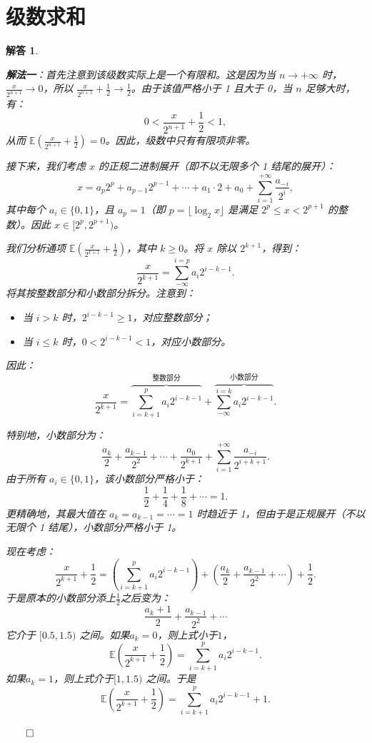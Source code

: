 \documentclass[12pt,UTF8,fontset=none]{ctexbook}
\theoremstyle{exercisestyle}
\theoremstyle{solutionstyle}
\newtheorem*{solution*}{解答}
\newenvironment{solution}
  {\begin{solution*}}
  {\hfill\ensuremath{\qed}\end{solution*}}
\begin{document}
\section{级数求和}\label{calcul-dune-somme}
\begin{solution}
\begin{subquestions}
\item \textbf{解法一}：首先注意到该级数实际上是一个有限和。这是因为当 $n \to +\infty$ 时，$\frac{x}{2^{n+1}} \to 0$，所以 $\frac{x}{2^{n+1}} + \frac{1}{2} \to \frac{1}{2}$。由于该值严格小于 1 且大于 0，当 $n$ 足够大时，有：
$$
0 < \frac{x}{2^{n+1}} + \frac{1}{2} < 1,
$$
从而 $\mathbb{E}\left(\frac{x}{2^{n+1}} + \frac{1}{2}\right) = 0$。因此，级数中只有有限项非零。

接下来，我们考虑 $x$ 的正规二进制展开（即不以无限多个 1 结尾的展开）：
$$
x = a_p 2^p + a_{p-1} 2^{p-1} + \cdots + a_1 \cdot 2 + a_0 + \sum_{i=1}^{+\infty} \frac{a_{-i}}{2^i},
$$
其中每个 $a_i \in \{0,1\}$，且 $a_p = 1$（即 $p = \lfloor \log_2 x \rfloor$ 是满足 $2^p \leq x < 2^{p+1}$ 的整数）。因此 $x \in [2^p, 2^{p+1})$。

我们分析通项 $\mathbb{E}\left(\frac{x}{2^{k+1}} + \frac{1}{2}\right)$，其中 $k \geq 0$。将 $x$ 除以 $2^{k+1}$，得到：
$$
\frac{x}{2^{k+1}} = \sum_{-\infty}^{i=p} a_i 2^{i - k - 1}.
$$
将其按整数部分和小数部分拆分。注意到：
\begin{itemize}
    \item 当 $i > k$ 时，$2^{i - k - 1} \geqslant 1$，对应整数部分；
    \item 当 $i \leqslant k$ 时，$0 < 2^{i - k - 1} < 1$，对应小数部分。
\end{itemize}
因此：
$$
\frac{x}{2^{k+1}} = \overbrace{\sum_{i=k+1}^{p} a_i 2^{i - k - 1}}^{\text{整数部分}} + \overbrace{\sum_{-\infty}^{i=k} a_i 2^{i - k - 1}}^{\text{小数部分}}.
$$

特别地，小数部分为：
$$
\frac{a_k}{2} + \frac{a_{k-1}}{2^2} + \cdots + \frac{a_0}{2^{k+1}} + \sum_{i=1}^{+\infty} \frac{a_{-i}}{2^{i + k + 1}}.
$$
由于所有 $a_i \in \{0,1\}$，该小数部分严格小于：
$$
\frac{1}{2} + \frac{1}{4} + \frac{1}{8} + \cdots = 1.
$$
更精确地，其最大值在 $a_k = a_{k-1} = \cdots = 1$ 时趋近于 1，但由于是正规展开（不以无限个 1 结尾），小数部分严格小于 1。

现在考虑：
$$
\frac{x}{2^{k+1}} + \frac{1}{2} = \left( \sum_{i=k+1}^{p} a_i 2^{i - k - 1} \right) + \left( \frac{a_k}{2} + \frac{a_{k-1}}{2^2} + \cdots \right) + \frac{1}{2}.
$$
于是原本的小数部分添上$\frac{1}{2}$之后变为：
$$
 \frac{a_k + 1}{2} + \frac{a_{k-1}}{2^2} + \cdots 
$$
它介于 $[0.5, 1.5)$ 之间。如果$a_k = 0$，则上式小于$1$，
$$
\mathbb{E}\left(\frac{x}{2^{k+1}} + \frac{1}{2}\right) = \sum_{i=k+1}^{p} a_i 2^{i - k - 1}.
$$
如果$a_k = 1$，则上式介于$[1, 1.5)$ 之间。于是
$$
\mathbb{E}\left(\frac{x}{2^{k+1}} + \frac{1}{2}\right) = \sum_{i=k+1}^{p} a_i 2^{i - k - 1} + 1.
$$


\end{subquestions}
\end{solution}
\end{document}
